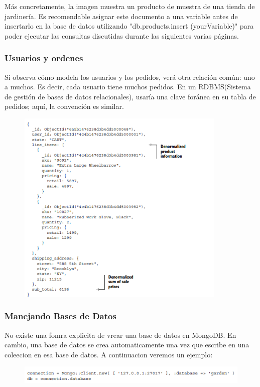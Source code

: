 \documentclass[preprint,12pt]{elsarticle}
\begin{document}
Más concretamente, la imagen muestra un producto de muestra de una tienda de jardinería. Es recomendable asignar este documento a una variable antes de insertarlo en la base de datos utilizando
"db.products.insert (yourVariable)" para poder ejecutar las consultas discutidas durante las
siguientes varias páginas.

\cite{Nosql}

\subsubsection{\textbf{Usuarios y ordenes}}
Si observa cómo modela los usuarios y los pedidos, verá otra relación común: uno a muchos. Es decir, cada usuario tiene muchos pedidos. En un RDBMS(Sistema de gestión de bases de datos relacionales), usaría una clave foránea en su tabla de pedidos; aquí, la convención es similar.
\begin{figure}[htb]
	\begin{center}
		\includegraphics[width=10cm]{./IMAGENES/mongodb2} %
	\end{center}
\end{figure}
\subsubsection{\textbf{Manejando Bases de Datos}}
No existe una fomra explicita de vrear una base de datos en MongoDB. En cambio, una base de datos se crea automaticamente una vez que escribe en una coleecion en esa base de datos. A continuacion veremos un ejemplo:
\begin{figure}[htb]
	\begin{center}
		\includegraphics[width=15cm]{./IMAGENES/mongodb3} %
	\end{center}
\end{figure}
\end{document}
